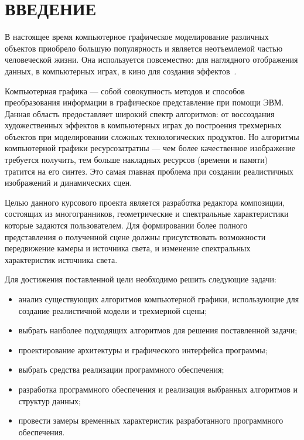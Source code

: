\section*{\centering ВВЕДЕНИЕ}

В настоящее время компьютерное графическое моделирование различных объектов приобрело большую популярность и является неотъемлемой частью человеческой жизни. Она используется повсеместно: для наглядного отображения данных, в компьютерных играх, в кино для создания эффектов~\cite{applicationcg}.

Компьютерная графика --- собой совокупность методов и способов преобразования информации в графическое представление при помощи ЭВМ. Данная область предоставляет широкий спектр алгоритмов: от воссоздания художественных эффектов в компьютерных играх до построения трехмерных объектов при моделировании сложных технологических продуктов. Но алгоритмы компьютерной графики ресурсозатратны --- чем более качественное изображение требуется получить, тем больше накладных ресурсов (времени и памяти) тратится на его синтез. Это самая главная проблема при создании реалистичных изображений и динамических сцен. 

Целью данного курсового проекта является разработка редактора композиции, состоящих из многогранников, геометрические и спектральные характеристики которые задаются пользователем. Для формировании более полного представления о полученной сцене должны присутствовать возможности передвижение камеры и источника света, и изменение спектральных характеристик источника света.

Для достижения поставленной цели необходимо решить следующие задачи:
\begin{itemize}
	\item анализ существующих алгоритмов компьютерной графики, использующие для создание реалистичной модели и трехмерной сцены;
	\item выбрать наиболее подходящих алгоритмов для решения поставленной задачи;
	\item проектирование архитектуры и графического интерфейса программы;
	\item выбрать средства реализации программного обеспечения;
	\item разработка программного обеспечения и реализация выбранных алгоритмов и структур данных;
	\item провести замеры временных характеристик разработанного программного обеспечения.  
\end{itemize}